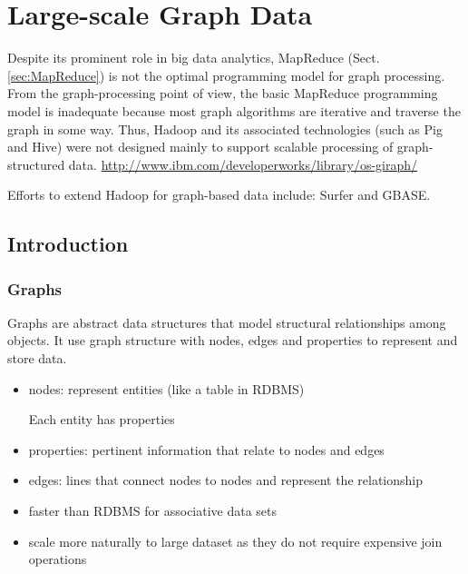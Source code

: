 \chapter{Large-scale Graph Data}
\label{chap:GraphData_LargeScale}

Despite its prominent role in big data analytics, MapReduce
(Sect.\ref{sec:MapReduce}) is not the optimal programming model for graph
processing. From the graph-processing point of view, the basic MapReduce
programming model is inadequate because most graph algorithms are iterative and
traverse the graph in some way. Thus, Hadoop and its associated technologies
(such as Pig and Hive) were not designed mainly to support scalable processing
of graph-structured data.
\url{http://www.ibm.com/developerworks/library/os-giraph/}

\begin{mdframed}
Efforts to extend Hadoop for graph-based data include:
Surfer and GBASE.
\end{mdframed}

\section{Introduction}

\subsection{Graphs}

Graphs are abstract data structures that model structural relationships among
objects. It use graph structure with nodes, edges and properties to represent and store
data.
\begin{itemize}
  \item nodes: represent entities (like a table in RDBMS)
  
  Each entity has properties
  
  \item properties: pertinent information that relate to nodes and edges
  
  \item edges: lines that connect nodes to nodes and represent the relationship
  
  \item faster than RDBMS for associative data sets
  
  \item scale more naturally to large dataset as they do not require expensive
  join operations
\end{itemize}

